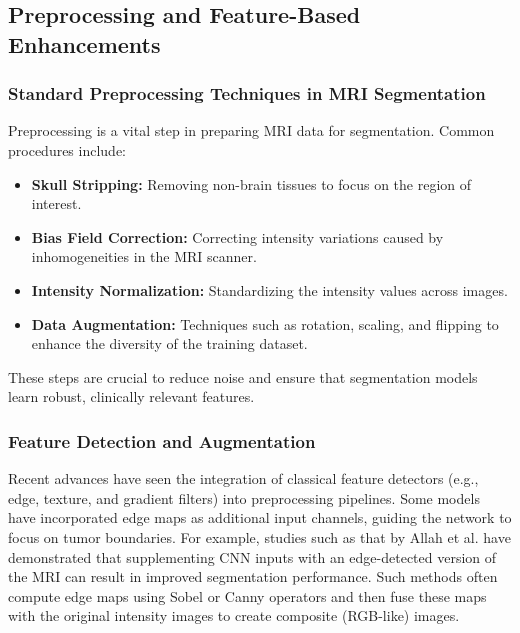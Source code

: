 \subsection{Preprocessing and Feature-Based Enhancements}
\label{sec:preprocessing_enhancements}

\subsubsection{Standard Preprocessing Techniques in MRI Segmentation}
\label{sec:standard_preprocessing}
Preprocessing is a vital step in preparing MRI data for segmentation. Common procedures include:
\begin{itemize}
    \item \textbf{Skull Stripping:} Removing non-brain tissues to focus on the region of interest.
    \item \textbf{Bias Field Correction:} Correcting intensity variations caused by inhomogeneities in the MRI scanner.
    \item \textbf{Intensity Normalization:} Standardizing the intensity values across images.
    \item \textbf{Data Augmentation:} Techniques such as rotation, scaling, and flipping to enhance the diversity of the training dataset.
\end{itemize}
These steps are crucial to reduce noise and ensure that segmentation models learn robust, clinically relevant features.

\subsubsection{Feature Detection and Augmentation}
\label{sec:feature_detection}
Recent advances have seen the integration of classical feature detectors (e.g., edge, texture, and gradient filters) into preprocessing pipelines. Some models have incorporated edge maps as additional input channels, guiding the network to focus on tumor boundaries. For example, studies such as that by Allah et al. \cite{allah2023edge} have demonstrated that supplementing CNN inputs with an edge-detected version of the MRI can result in improved segmentation performance. Such methods often compute edge maps using Sobel \cite{sobel1968isotropic} or Canny operators and then fuse these maps with the original intensity images to create composite (RGB-like) images.

